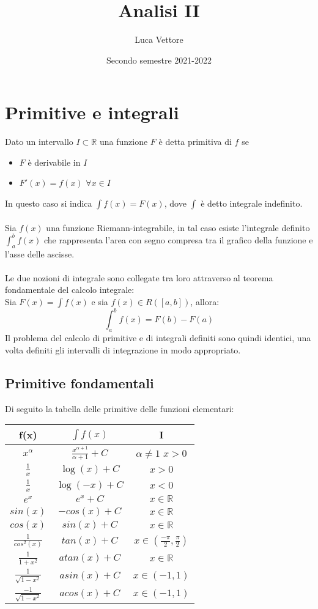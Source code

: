 \documentclass{article}
\title{Analisi II}
\author{Luca Vettore}
\date{Secondo semestre 2021-2022}
\newcommand{\R}{\mathds{R}}
\begin{document}
\maketitle

\section{Primitive e integrali}
Dato un intervallo $I\subset\R$ una funzione $F$ è detta primitiva di $f$ se
\begin{itemize}
    \item $F$ è derivabile in $I$
    \item $F'(x)=f(x)$ $\forall x\in I$
\end{itemize}
In questo caso si indica $\int f(x)=F(x)$, dove $\int$ è detto integrale indefinito.\\\\
Sia $f(x)$ una funzione Riemann-integrabile, in tal caso esiste l'integrale definito $\int_a^bf(x)$ che rappresenta l'area con segno compresa tra il grafico della funzione e l'asse delle ascisse.\\\\
Le due nozioni di integrale sono collegate tra loro attraverso al teorema fondamentale del calcolo integrale:\\
Sia $F(x)=\int f(x)$ e sia $f(x)\in R([a,b])$, allora: $$\int_a^bf(x)=F(b)-F(a)$$
Il problema del calcolo di primitive e di integrali definiti sono quindi identici, una volta definiti gli intervalli di integrazione in modo appropriato.

\subsection{Primitive fondamentali}
Di seguito la tabella delle primitive delle funzioni elementari:

\begin{center}
\begin{tabular}{||c|c|c||}
    \hline
    f(x) & $\int f(x)$ & I\\
    \hline\hline
    $x^\alpha$ & $\frac{x^{\alpha+1}}{\alpha+1} + C$ & $\alpha\neq1$ $x>0$\\
    \hline
    $\frac{1}{x}$ & $\log(x) + C$ & $x>0$\\
    \hline
    $\frac{1}{x}$ & $\log(-x) + C$ & $x<0$\\
    \hline
    $e^x$ & $e^x + C$ & $x\in\R$\\
    \hline
    $sin(x)$ & $-cos(x) + C$ & $x\in\R$\\
    \hline
    $cos(x)$ & $sin(x) + C$ & $x\in\R$\\
    \hline
    $\frac{1}{cos^2(x)}$ & $tan(x) + C$ & $x\in(\frac{-\pi}{2},\frac{\pi}{2})$\\
    \hline
    $\frac{1}{1+x^2}$ & $atan(x) + C$ & $x\in\R$\\
    \hline
    $\frac{1}{\sqrt{1-x^2}}$ & $asin(x) + C$ & $x\in(-1,1)$\\
    \hline
    $\frac{-1}{\sqrt{1-x^2}}$ & $acos(x) + C$ & $x\in(-1,1)$\\
    
    \hline
    \end{tabular}
\end{center}
\end{document}
